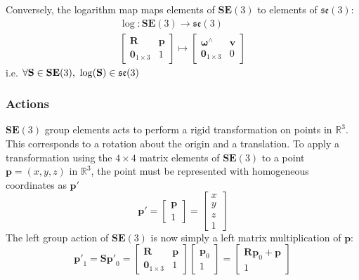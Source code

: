 			Conversely, the logarithm map maps elements of $\mathbf{SE}(3)$ to elements of $\mathfrak{se}(3)$:
			\begin{equation}
				\begin{split}
					\log: \mathbf{SE}(3) \rightarrow \mathfrak{se}(3)\\
					\begin{bmatrix}
						\mathbf{R}	&	\mathbf{p} \\
						\textbf{0}_{1 \times 3}		& 	1 					 				  
					\end{bmatrix}
					\mapsto
					\begin{bmatrix}
					 	\bm{\omega}^{\wedge}	&  \mathbf{v}\\
					 	\textbf{0}_{1 \times 3} & 0			
					\end{bmatrix}
				\end{split}		
			\end{equation}		
			i.e. $\forall \mathbf{S} \in \mathbf{SE}(3)  \textnormal{, } \log(\mathbf{S}) \in  \mathfrak{se}(3)$
		
		\subsubsection{Actions}
		$\mathbf{SE}(3)$ group elements acts to perform a rigid transformation on points in $\mathbb{R}^3$. This corresponds to a rotation about the origin and a translation.
		To apply a transformation using the $4 \times 4$ matrix elements of $\mathbf{SE}(3)$ to a point $\textbf{p} = (x,y,z) $ in $\mathbb{R}^3$, the point must be represented with homogeneous coordinates as $\mathbf{p'}$
		\begin{equation}
			\mathbf{p'} = 
			\begin{bmatrix}
				  \mathbf{p} \\
				  1	
			\end{bmatrix} =
			\begin{bmatrix}
				  x	\\
				  y	\\
				  z	\\
				  1	
			\end{bmatrix}
		\end{equation}
		The left group action of $\mathbf{SE}(3)$ is now simply a left matrix multiplication of $\mathbf{p}$:
		\begin{equation}
			\mathbf{p'}_1 = \mathbf{S}\mathbf{p'}_0 = 
			\begin{bmatrix}
				\mathbf{R}	&	\mathbf{p} \\
				\textbf{0}_{1 \times 3}		& 	1 					 				  
			\end{bmatrix}
			\begin{bmatrix}
				\mathbf{p}_0 \\
				1	
			\end{bmatrix}
			=
			\begin{bmatrix}
				\mathbf{R}\mathbf{p}_0 + \mathbf{p}\\
				1	
			\end{bmatrix}
		\end{equation}
		

